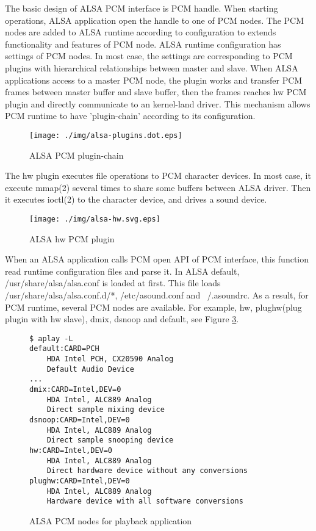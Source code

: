\documentclass[onecolumn]{article}
\begin{document}
The basic design of ALSA PCM interface is PCM handle. When starting operations, ALSA application open the handle to one of PCM nodes. The PCM nodes are added to ALSA runtime according to configuration to extends functionality and features of PCM node. ALSA runtime configuration has settings of PCM nodes. In most case, the settings are corresponding to PCM plugins with hierarchical relationships between master and slave. When ALSA applications access to a master PCM node, the plugin works and transfer PCM frames between master buffer and slave buffer, then the frames reaches hw PCM plugin and directly communicate to an kernel-land driver. This mechanism allows PCM runtime to have 'plugin-chain' according to its configuration. 

\begin{figure}[htbp]
	\centering
	\texttt{[image: ./img/alsa-plugins.dot.eps]}
	\caption{{ALSA PCM plugin-chain}}
	\label{alsa_plugins}
\end{figure}

The hw plugin executes file operations to PCM character devices. In most case, it execute mmap(2) several times to share some buffers between ALSA driver. Then it executes ioctl(2) to the character device, and drives a sound device.

\begin{figure}[htbp]
	\centering
	\texttt{[image: ./img/alsa-hw.svg.eps]}
	\caption{{ALSA hw PCM plugin}}
	\label{fig:alsa-hw-plugin}
\end{figure}

When an ALSA application calls PCM open API of PCM interface, this function read runtime configuration files and parse it. In ALSA default, /usr/share/alsa/alsa.conf is loaded at first. This file loads /usr/share/alsa/alsa.conf.d/*, /etc/asound.conf and ~/.asoundrc. As a result, for PCM runtime, several PCM nodes are available. For example, hw, plughw(plug plugin with hw slave), dmix, dsnoop and default, see Figure \ref{pcm-nodes-playback}.

\begin{figure}[htbp]
\small
\begin{verbatim}
$ aplay -L
default:CARD=PCH
    HDA Intel PCH, CX20590 Analog
    Default Audio Device
...
dmix:CARD=Intel,DEV=0
    HDA Intel, ALC889 Analog
    Direct sample mixing device
dsnoop:CARD=Intel,DEV=0
    HDA Intel, ALC889 Analog
    Direct sample snooping device
hw:CARD=Intel,DEV=0
    HDA Intel, ALC889 Analog
    Direct hardware device without any conversions
plughw:CARD=Intel,DEV=0
    HDA Intel, ALC889 Analog
    Hardware device with all software conversions
\end{verbatim}
\caption{ALSA PCM nodes for playback application}
\label{pcm-nodes-playback}
\end{figure}
\end{document}
